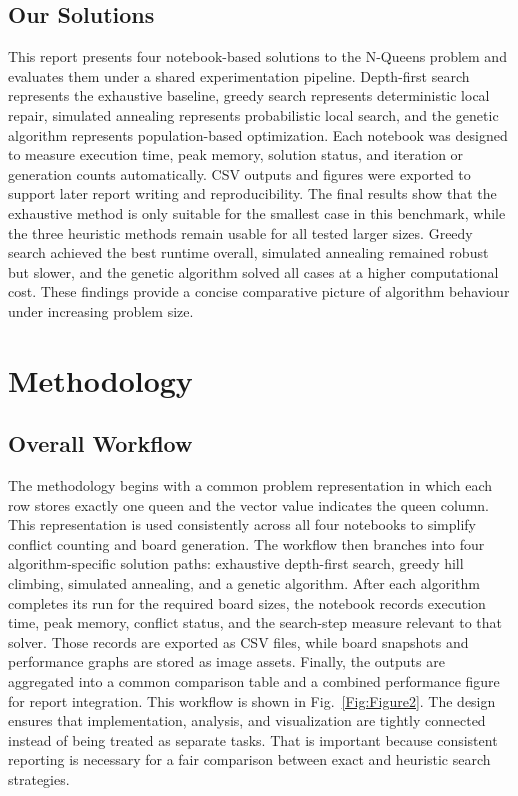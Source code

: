 \documentclass[conference]{IEEEtran}
\begin{document}
\subsection{Our Solutions}
This report presents four notebook-based solutions to the N-Queens problem and evaluates them under a shared experimentation pipeline. Depth-first search represents the exhaustive baseline, greedy search represents deterministic local repair, simulated annealing represents probabilistic local search, and the genetic algorithm represents population-based optimization. Each notebook was designed to measure execution time, peak memory, solution status, and iteration or generation counts automatically. CSV outputs and figures were exported to support later report writing and reproducibility. The final results show that the exhaustive method is only suitable for the smallest case in this benchmark, while the three heuristic methods remain usable for all tested larger sizes. Greedy search achieved the best runtime overall, simulated annealing remained robust but slower, and the genetic algorithm solved all cases at a higher computational cost. These findings provide a concise comparative picture of algorithm behaviour under increasing problem size.

\section{Methodology}
\subsection{Overall Workflow}
The methodology begins with a common problem representation in which each row stores exactly one queen and the vector value indicates the queen column. This representation is used consistently across all four notebooks to simplify conflict counting and board generation. The workflow then branches into four algorithm-specific solution paths: exhaustive depth-first search, greedy hill climbing, simulated annealing, and a genetic algorithm. After each algorithm completes its run for the required board sizes, the notebook records execution time, peak memory, conflict status, and the search-step measure relevant to that solver. Those records are exported as CSV files, while board snapshots and performance graphs are stored as image assets. Finally, the outputs are aggregated into a common comparison table and a combined performance figure for report integration. This workflow is shown in Fig.~\ref{Fig:Figure2}. The design ensures that implementation, analysis, and visualization are tightly connected instead of being treated as separate tasks. That is important because consistent reporting is necessary for a fair comparison between exact and heuristic search strategies.
\end{document}
